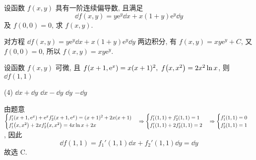\begin{example}[第九届数学竞赛决赛]
    设函数 $f(x,y)$ 具有一阶连续偏导数, 且满足 $$\dd f(x,y)=y\mathrm{e}^y\dd x+x(1+y)\mathrm{e}^y\dd y$$ 及 $f(0,0)=0$, 求 $f(x,y).$
\end{example}
\begin{solution}
    对方程 $\dd f(x,y)=y\mathrm{e}^y\dd x+x(1+y)\mathrm{e}^y\dd y$ 两边积分, 有 $f(x,y)=xy\mathrm{e}^y+C$, 又 $f(0,0)=0$, 所以 $f(x,y)=xy\mathrm{e}^y$.
\end{solution}

\begin{example}[2021 数一]
    设函数 $f(x,y)$ 可微, 且 $f\qty(x+1,\mathrm{e}^x)=x(x+1)^2,~f\qty(x,x^2)=2x^2\ln x$, 则 $\dd f(1,1)$
    \begin{tasks}(4)
        \task $\dd x+\dd y$
        \task $\dd x-\dd y$
        \task $\dd y$
        \task $-\dd y$
    \end{tasks}
\end{example}
\begin{solution}
    由题意 $\begin{cases}
            f_1'\qty(x+1,\mathrm{e}^x)+\mathrm{e}^xf_2'\qty(x+1,\mathrm{e}^x)=(x+1)^2+2x(x+1) \\
            f_1'\qty(x,x^2)+2xf_2'\qty(x,x^2)=4x\ln x+2x
        \end{cases}\Rightarrow \begin{cases}
            f_1'(1,1)+f_2'(1,1)=1 \\
            f_1'(1,1)+2f_2'(1,1)=2
        \end{cases}\Rightarrow \begin{cases}
            f_1'(1,1)=0 \\
            f_2'(1,1)=1
        \end{cases}$, 因此
    $$\dd f(1,1)=f_1'(1,1)\dd x+f_2'(1,1)\dd y=\dd y$$
    故选 C.
\end{solution}

